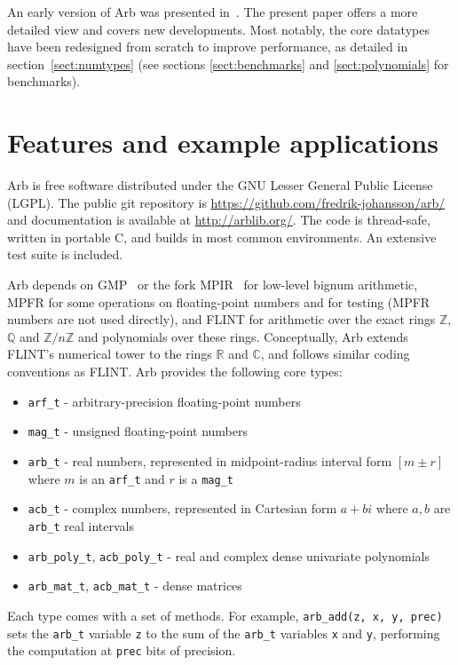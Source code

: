 \documentclass[10pt,journal,compsoc,cspaper]{IEEEtran}
\begin{document}
An early version of Arb was presented in~\cite{Johansson2013arb}.
The present paper offers a more detailed view and covers new developments.
Most notably, the core datatypes have been redesigned from scratch to
improve performance, as detailed in section~\ref{sect:numtypes}
(see sections \ref{sect:benchmarks} and \ref{sect:polynomials} for benchmarks).


\section{Features and example applications}

Arb is free software distributed under the
GNU Lesser General Public License (LGPL).
The public git repository is \url{https://github.com/fredrik-johansson/arb/}
and documentation is available at \url{http://arblib.org/}.
The code is thread-safe, written in portable C,
and builds in most common environments. An extensive test suite is included.

Arb depends on GMP~\cite{GMP} or the fork MPIR~\cite{MPIR}
for low-level bignum arithmetic, MPFR for some operations on floating-point
numbers and for testing (MPFR numbers are not used directly),
and FLINT \cite{Hart2010} for arithmetic over the exact rings
$\mathbb{Z}$, $\mathbb{Q}$ and $\mathbb{Z}/n\mathbb{Z}$ and polynomials
over these rings.
Conceptually, Arb extends FLINT's
numerical tower to the rings $\mathbb{R}$ and $\mathbb{C}$,
and follows similar coding conventions as FLINT.
Arb provides the following core types:
\begin{itemize}
\item \texttt{arf\_t} - arbitrary-precision floating-point numbers
\item \texttt{mag\_t} - unsigned floating-point numbers
\item \texttt{arb\_t} - real numbers, represented in midpoint-radius interval form $[m \pm r]$ where $m$ is an \texttt{arf\_t} and $r$ is a \texttt{mag\_t}
\item \texttt{acb\_t} - complex numbers, represented in Cartesian form $a+bi$ where $a,b$ are \texttt{arb\_t} real intervals
\item \texttt{arb\_poly\_t}, \texttt{acb\_poly\_t} - real and complex dense univariate polynomials
\item \texttt{arb\_mat\_t}, \texttt{acb\_mat\_t} - dense matrices
\end{itemize}

Each type comes with a set of methods.
For example, \texttt{arb\_add(z, x, y, prec)}
sets the \texttt{arb\_t} variable \texttt{z}
to the sum of the \texttt{arb\_t} variables
\texttt{x} and \texttt{y}, performing the computation at \texttt{prec} bits of precision.
\end{document}
